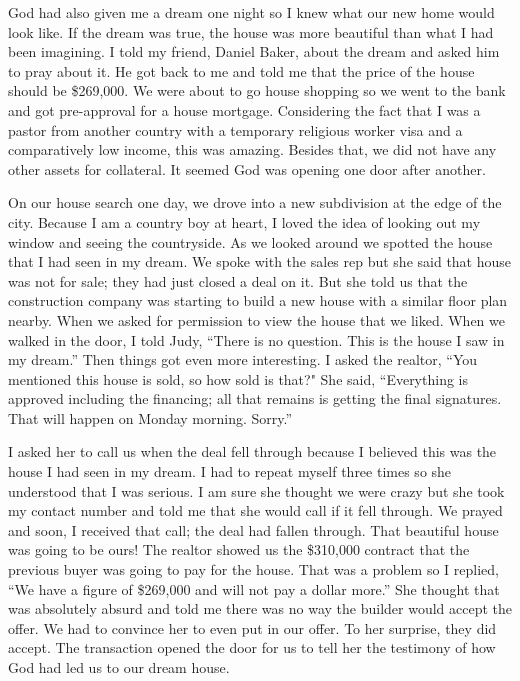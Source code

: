 \documentclass[twoside, 12pt]{book}
\begin{document}
God had also given me a dream one night so I knew what our new home would look like. If the dream was true, the house was more beautiful than what I had been imagining. I told my friend, Daniel Baker, about the dream and asked him to pray about it. He got back to me and told me that the price of the house should be \$269,000. We were about to go house shopping so we went to the bank and got pre-approval for a house mortgage. Considering the fact that I was a pastor from another country with a temporary religious worker visa and a comparatively low income, this was amazing. Besides that, we did not have any other assets for collateral. It seemed God was opening one door after another.

On our house search one day, we drove into a new subdivision at the edge of the city. Because I am a country boy at heart, I loved the idea of looking out my window and seeing the countryside.  As we looked around we spotted the house that I had seen in my dream. We spoke with the sales rep but she said that house was not for sale; they had just closed a deal on it. But she told us that the construction company was starting to build a new house with a similar floor plan nearby. When we asked for permission to view the house that we liked. When we walked in the door, I told Judy, “There is no question. This is the house I saw in my dream.” Then things got even more interesting. I asked the realtor, “You mentioned this house is sold, so how sold is that?" She said, “Everything is approved including the financing; all that remains is getting the final signatures. That will happen on Monday morning. Sorry.” 

I asked her to call us when the deal fell through because I believed this was the house I had seen in my dream. I had to repeat myself three times so she understood that I was serious. I am sure she thought we were crazy but she took my contact number and told me that she would call if it fell through. We prayed and soon, I received that call; the deal had fallen through. That beautiful house was going to be ours! The realtor showed us the \$310,000 contract that the previous buyer was going to pay for the house. That was a problem so I replied, “We have a figure of \$269,000 and will not pay a dollar more.” She thought that was absolutely absurd and told me there was no way the builder would accept the offer. We had to convince her to even put in our offer. To her surprise, they did accept. The transaction opened the door for us to tell her the testimony of how God had led us to our dream house.
\end{document}
